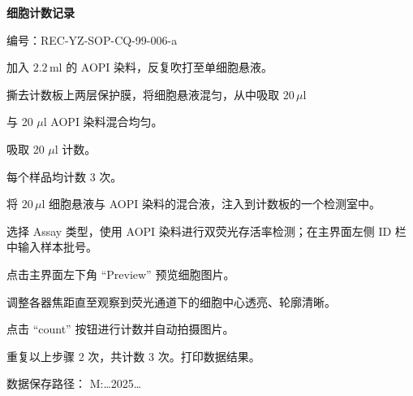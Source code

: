 \documentclass[UTF8,10pt,a4paper,fontset=fandol]{ctexart}
\newcommand{\fieldvalue}[1]{#1}
\newcommand{\handwritten}[1]{#1}
\begin{document}

\newpage

\noindent\textbf{细胞计数记录}

\noindent
编号：REC-YZ-SOP-CQ-99-006-a

\medskip
\noindent
加入 $2.2\,\mathrm{ml}$ 的 AOPI 染料，反复吹打至单细胞悬液。

\noindent
撕去计数板上两层保护膜，将细胞悬液混匀，从中吸取 $20\,\mu\mathrm{l}$

\noindent
与
\fieldvalue{\handwritten{20}}
$\mu\mathrm{l}$ AOPI 染料混合均匀。

\noindent
吸取
\fieldvalue{\handwritten{20}}
$\mu\mathrm{l}$ 计数。

\noindent
每个样品均计数
\fieldvalue{\handwritten{3}}
次。

\noindent
将 $20\,\mu\mathrm{l}$ 细胞悬液与 AOPI 染料的混合液，注入到计数板的一个检测室中。

\noindent
选择 Assay 类型，使用 AOPI 染料进行双荧光存活率检测；在主界面左侧 ID 栏中输入样本批号。

\noindent
点击主界面左下角 ``Preview'' 预览细胞图片。

\noindent
调整各器焦距直至观察到荧光通道下的细胞中心透亮、轮廓清晰。

\noindent
点击 ``count'' 按钮进行计数并自动拍摄图片。

\noindent
重复以上步骤 2 次，共计数 3 次。打印数据结果。

\medskip

\noindent
数据保存路径：
\fieldvalue{\handwritten{M:\ldots 2025\ldots}}
\end{document}
